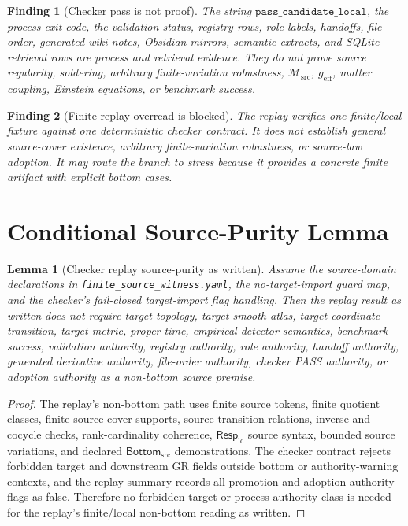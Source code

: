 \documentclass[11pt]{article}
\newcommand{\RespLC}{\mathsf{Resp}_{\mathrm{lc}}}
\newcommand{\Msrc}{\mathcal{M}_{\mathrm{src}}}
\newcommand{\geff}{g_{\mathrm{eff}}}
\newcommand{\BottomSrc}{\mathsf{Bottom}_{\mathrm{src}}}
\newtheorem{finding}{Finding}
\newtheorem{lemma}{Lemma}
\begin{document}
\begin{finding}[Checker pass is not proof]
The string \(\texttt{pass\_candidate\_local}\), the process exit code, the
validation status, registry rows, role labels, handoffs, file order, generated
wiki notes, Obsidian mirrors, semantic extracts, and SQLite retrieval rows are
process and retrieval evidence. They do not prove source regularity, soldering,
arbitrary finite-variation robustness, \(\Msrc\), \(\geff\), matter coupling,
Einstein equations, or benchmark success.
\end{finding}

\begin{finding}[Finite replay overread is blocked]
The replay verifies one finite/local fixture against one deterministic checker
contract. It does not establish general source-cover existence, arbitrary
finite-variation robustness, or source-law adoption. It may route the branch to
stress because it provides a concrete finite artifact with explicit bottom
cases.
\end{finding}

\section{Conditional Source-Purity Lemma}

\begin{lemma}[Checker replay source-purity as written]
Assume the source-domain declarations in
\texttt{finite\_source\_witness.yaml}, the no-target-import guard map, and the
checker's fail-closed target-import flag handling. Then the replay result as
written does not require target topology, target smooth atlas, target
coordinate transition, target metric, proper time, empirical detector
semantics, benchmark success, validation authority, registry authority, role
authority, handoff authority, generated derivative authority, file-order
authority, checker PASS authority, or adoption authority as a non-bottom source
premise.
\end{lemma}

\begin{proof}
The replay's non-bottom path uses finite source tokens, finite quotient
classes, finite source-cover supports, source transition relations, inverse and
cocycle checks, rank-cardinality coherence, \(\RespLC\) source syntax,
bounded source variations, and declared \(\BottomSrc\) demonstrations. The
checker contract rejects forbidden target and downstream GR fields outside
bottom or authority-warning contexts, and the replay summary records all
promotion and adoption authority flags as false. Therefore no forbidden target
or process-authority class is needed for the replay's finite/local non-bottom
reading as written.
\end{proof}
\end{document}
